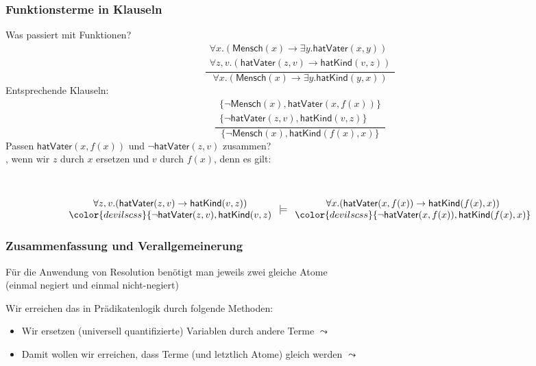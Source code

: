 \documentclass[aspectratio=1610,onlymath]{beamer}
\begin{document}
\begin{frame}\frametitle{Funktionsterme in Klauseln}

Was passiert mit Funktionen?
%
\[ \frac{
\begin{array}{c}
\forall x.(\textsf{Mensch}(x)\to\exists y.\textsf{hatVater}(x,y))\\
\forall z,v.(\textsf{hatVater}(z,v)\to\textsf{hatKind}(v,z))
\end{array}
}
{
\forall x.(\textsf{Mensch}(x)\to\exists y.\textsf{hatKind}(y,x))
}
\]
%
Entsprechende Klauseln:
\[ \frac{
\begin{array}{c}
\{\neg\textsf{Mensch}(x),\textsf{hatVater}(x,f(x))\}\\
\{\neg\textsf{hatVater}(z,v),\textsf{hatKind}(v,z)\}
\end{array}
}
{
\{\neg\textsf{Mensch}(x),\textsf{hatKind}(f(x),x)\}
}
\]
Passen $\textsf{hatVater}(x,f(x))$ und $\neg\textsf{hatVater}(z,v)$ zusammen?\\\pause
{}, wenn wir $z$ durch $x$ ersetzen und $v$ durch $f(x)$, denn es gilt:

~\hspace{-1cm}%
\begin{minipage}{8cm}
\footnotesize
\[\begin{array}{c}
\forall z,v.(\textsf{hatVater}(z,v)\to\textsf{hatKind}(v,z))\\
{\color{devilscss}\{\neg\textsf{hatVater}(z,v),\textsf{hatKind}(v,z)}
\end{array}
\models
\begin{array}{c}
\forall x.(\textsf{hatVater}(x,f(x))\to\textsf{hatKind}(f(x),x))\\
{\color{devilscss}\{\neg\textsf{hatVater}(x,f(x)),\textsf{hatKind}(f(x),x)\}}
\end{array}
\]
\end{minipage}

\end{frame}

\begin{frame}\frametitle{Zusammenfassung und Verallgemeinerung}

Für die Anwendung von Resolution benötigt man jeweils zwei gleiche Atome\\ (einmal negiert und einmal nicht-negiert)\medskip

Wir erreichen das in Prädikatenlogik durch folgende Methoden:
\begin{itemize}
\item Wir ersetzen (universell quantifizierte) Variablen durch andere Terme $\leadsto$~
\item Damit wollen wir erreichen, dass Terme (und letztlich Atome) gleich werden $\leadsto$~
\end{itemize}

\end{frame}
\end{document}
